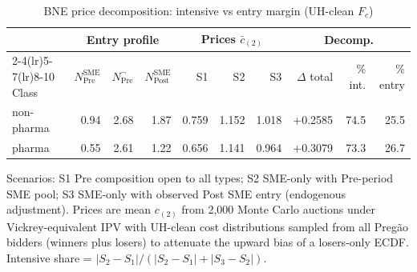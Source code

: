 \begin{table}[htbp]
\centering
\begin{threeparttable}
\caption{BNE price decomposition: intensive vs entry margin (UH-clean $F_c$)}
\label{tab:v3_bne_decomp}
\small
\begin{tabular}{lrrrrrrrrr}
\toprule
 & \multicolumn{3}{c}{Entry profile} & \multicolumn{3}{c}{Prices $\bar c_{(2)}$} & \multicolumn{3}{c}{Decomp.} \\
\cmidrule(lr){2-4}\cmidrule(lr){5-7}\cmidrule(lr){8-10}
Class & $N^{\text{SME}}_{\text{Pre}}$ & $N^{\neg}_{\text{Pre}}$ & $N^{\text{SME}}_{\text{Post}}$ & S1 & S2 & S3 & $\Delta$ total & \% int. & \% entry \\
\midrule
non-pharma & 0.94 & 2.68 & 1.87 & 0.759 & 1.152 & 1.018 & +0.2585 & 74.5 & 25.5 \\
pharma & 0.55 & 2.61 & 1.22 & 0.656 & 1.141 & 0.964 & +0.3079 & 73.3 & 26.7 \\
\bottomrule
\end{tabular}
\begin{tablenotes}\footnotesize
\item Scenarios: S1 Pre composition open to all types; S2 SME-only
with Pre-period SME pool; S3 SME-only with observed Post SME
entry (endogenous adjustment). Prices are mean $c_{(2)}$ from 2{,}000
Monte Carlo auctions under Vickrey-equivalent IPV with UH-clean
cost distributions sampled from all Preg\~ao bidders (winners plus
losers) to attenuate the upward bias of a losers-only ECDF.
Intensive share = $|S_2 - S_1| / (|S_2-S_1| + |S_3-S_2|)$.
\end{tablenotes}
\end{threeparttable}
\end{table}
